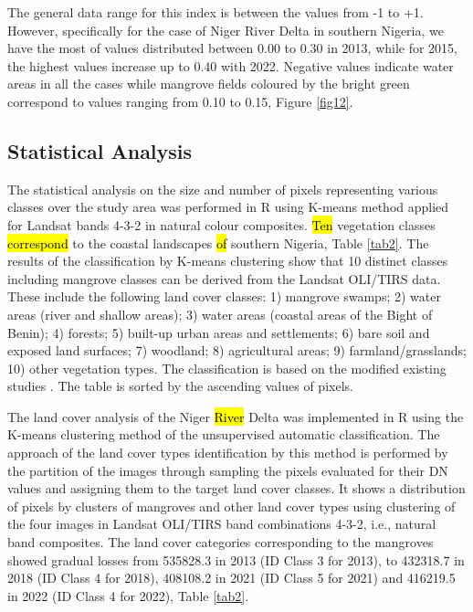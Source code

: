 \documentclass[jmse,article,submit,pdftex,moreauthors]{Definitions/mdpi}
\begin{document}
The general data range for this index is between the values from -1 to +1. However, specifically for the case of Niger River Delta in southern Nigeria, we have the most of values distributed between 0.00 to 0.30 in 2013, while for 2015, the highest values increase up to 0.40 with 2022. Negative values indicate water areas in all the cases while mangrove fields coloured by the bright green correspond to values ranging from 0.10 to 0.15, Figure \ref{fig12}.  

\subsection{Statistical Analysis}

The statistical analysis on the size and number of pixels representing various classes over the study area was performed in R using K-means method applied for Landsat bands 4-3-2 in natural colour composites. \hl{Ten} vegetation classes \hl{correspond} to the coastal landscapes \hl{of} southern Nigeria, Table \ref{tab2}. The results of the classification by K-means clustering show that 10 distinct classes including mangrove classes can be derived from the Landsat OLI/TIRS data. These include the following land cover classes: 1) mangrove swamps; 2) water areas (river and shallow areas); 3) water areas (coastal areas of the Bight of Benin); 4) forests; 5) built-up urban areas and settlements; 6) bare soil and exposed land surfaces; 7) woodland; 8) agricultural areas; 9) farmland/grasslands; 10) other vegetation types. The classification is based on the modified existing studies \cite{rs12213619,nhess1433172014,Eyoh,Udoka}. The table is sorted by the ascending values of pixels. 

The land cover analysis of the Niger \hl{River} Delta was implemented in R using the K-means clustering method of the unsupervised automatic classification. The approach of the land cover types identification by this method is performed by the partition of the images through sampling the pixels evaluated for their DN values and assigning them to the target land  cover classes. It shows a distribution of pixels by clusters of mangroves and other land cover types using clustering of the four images in Landsat OLI/TIRS band combinations 4-3-2, i.e., natural band composites. The land cover categories corresponding to the mangroves showed gradual losses from 535828.3 in 2013 (ID Class 3 for 2013), to 432318.7 in 2018 (ID Class 4 for 2018), 408108.2 in 2021 (ID Class 5 for 2021) and 416219.5 in 2022 (ID Class 4 for 2022), Table \ref{tab2}.
\end{document}
